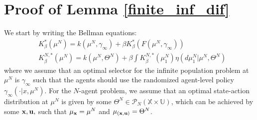 \documentclass[twoside,11pt]{article}
\def\P{{\mathcal P}}
\begin{document}
\section{Proof of Lemma \ref{finite_inf_dif}}\label{finite_inf_dif_proof}
We start by writing the Bellman equations:
\begin{align*}
&K_\beta^*(\mu^N) = k(\mu^N,\gamma_\infty) + \beta K_\beta^*(F(\mu^N,\gamma_\infty))\\
& K_\beta^{N,*}(\mu^N) = k(\mu^N,\Theta^N) + \beta \int K_\beta^{N,*}(\mu_1^N)\eta(d\mu_1^N|\mu^N,\Theta^N)
\end{align*}
where we assume that an optimal selector for the infinite population problem at $\mu^N$ is $\gamma_\infty$ such that the agents should use the randomized agent-level policy $\gamma_\infty(\cdot|x,\mu^N)$. For the $N$-agent problem, we assume that an optimal state-action distribution at $\mu^N$ is given by some $\Theta^N \in \P_N(\mathds{X}\times\mathds{U})$, which can be achieved by some ${\bf x,u,}$ such that $\mu_{\bf x}=\mu^N$ and $\mu_{(\bf x,u)}=\Theta^N$. 
\end{document}
